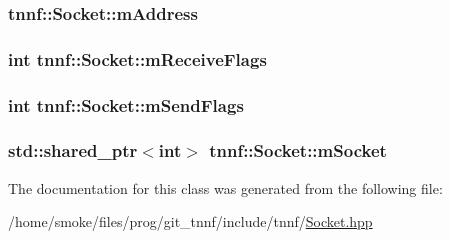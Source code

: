 \subsubsection[{m\+Address}]{ tnnf\+::\+Socket\+::m\+Address\hspace{0.3cm}{\ttfamily [protected]}}\label{classtnnf_1_1_socket_ac1e73970f545a227cafe59d06055894a}
\hypertarget{classtnnf_1_1_socket_ae341169968bd93277efa50933fb7e7a5}{}
\subsubsection[{m\+Receive\+Flags}]{\setlength{\rightskip}{0pt plus 5cm}int tnnf\+::\+Socket\+::m\+Receive\+Flags\hspace{0.3cm}{\ttfamily [protected]}}\label{classtnnf_1_1_socket_ae341169968bd93277efa50933fb7e7a5}
\hypertarget{classtnnf_1_1_socket_af315481b3d9eee64a5b359dcbbe69567}{}
\subsubsection[{m\+Send\+Flags}]{\setlength{\rightskip}{0pt plus 5cm}int tnnf\+::\+Socket\+::m\+Send\+Flags\hspace{0.3cm}{\ttfamily [protected]}}\label{classtnnf_1_1_socket_af315481b3d9eee64a5b359dcbbe69567}
\hypertarget{classtnnf_1_1_socket_a85ca419f6b85101d19885eb72ce32f47}{}
\subsubsection[{m\+Socket}]{\setlength{\rightskip}{0pt plus 5cm}std\+::shared\+\_\+ptr$<$int$>$ tnnf\+::\+Socket\+::m\+Socket\hspace{0.3cm}{\ttfamily [protected]}}\label{classtnnf_1_1_socket_a85ca419f6b85101d19885eb72ce32f47}


The documentation for this class was generated from the following file\+:\begin{DoxyCompactItemize}
\item 
/home/smoke/files/prog/git\+\_\+tnnf/include/tnnf/\hyperlink{_socket_8hpp}{Socket.\+hpp}\end{DoxyCompactItemize}
